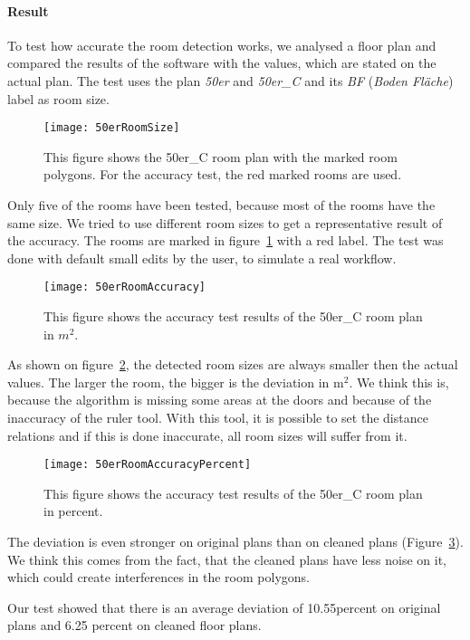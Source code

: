 \paragraph{Result}
To test how accurate the room detection works, we analysed a floor plan and compared the results of the software with the values, which are stated on the actual plan. The test uses the plan \textit{50er} and \textit{50er\_C} and its \textit{BF} (\textit{Boden Fläche}) label as room size.

\begin{figure}[H]
	\centering
	\texttt{[image: 50erRoomSize]}
	\caption{This figure shows the 50er\_C room plan with the marked room polygons. For the accuracy test, the red marked rooms are used.}
	\label{fig:50erRoomSize}
\end{figure}

Only five of the rooms have been tested, because most of the rooms have the same size. We tried to use different room sizes to get a representative result of the accuracy. The rooms are marked in figure~\ref{fig:50erRoomSize} with a red label. The test was done with default small edits by the user, to simulate a real workflow.

\begin{figure}[H]
	\centering
	\texttt{[image: 50erRoomAccuracy]}
	\caption{This figure shows the accuracy test results of the 50er\_C room plan in $m^{2}$.}
	\label{fig:50erRoomAccuracy}
\end{figure}

As shown on figure~\ref{fig:50erRoomAccuracy}, the detected room sizes are always smaller then the actual values. The larger the room, the bigger is the deviation in m$^{2}$. We think this is, because the algorithm is missing some areas at the doors and because of the inaccuracy of the ruler tool. With this tool, it is possible to set the distance relations and if this is done inaccurate, all room sizes will suffer from it.

\begin{figure}[H]
	\centering
	\texttt{[image: 50erRoomAccuracyPercent]}
	\caption{This figure shows the accuracy test results of the 50er\_C room plan in percent.}
	\label{fig:50erRoomAccuracyPercent}
\end{figure}

The deviation is even stronger on original plans than on cleaned plans (Figure~\ref{fig:50erRoomAccuracyPercent}). We think this comes from the fact, that the cleaned plans have less noise on it, which could create interferences in the room polygons.

Our test showed that there is an average deviation of 10.55percent on original plans and 6.25 percent on cleaned floor plans.


